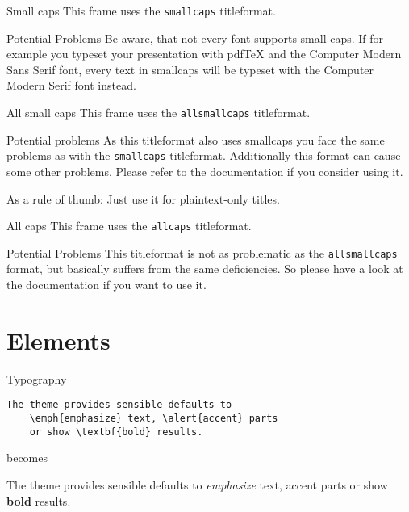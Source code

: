 \documentclass[10pt]{beamer}
\begin{document}
    {
\begin{frame}{Small caps}
        This frame uses the \texttt{smallcaps} titleformat.
    
        \begin{alertblock}{Potential Problems}
            Be aware, that not every font supports small caps. If for example you typeset your presentation with pdfTeX and the Computer Modern Sans Serif font, every text in smallcaps will be typeset with the Computer Modern Serif font instead.
        \end{alertblock}
\end{frame}
    }
    
    {
\begin{frame}{All small caps}
        This frame uses the \texttt{allsmallcaps} titleformat.
    
        \begin{alertblock}{Potential problems}
            As this titleformat also uses smallcaps you face the same problems as with the \texttt{smallcaps} titleformat. Additionally this format can cause some other problems. Please refer to the documentation if you consider using it.
    
            As a rule of thumb: Just use it for plaintext-only titles.
        \end{alertblock}
\end{frame}
    }
    
    {
\begin{frame}{All caps}
        This frame uses the \texttt{allcaps} titleformat.
    
        \begin{alertblock}{Potential Problems}
            This titleformat is not as problematic as the \texttt{allsmallcaps} format, but basically suffers from the same deficiencies. So please have a look at the documentation if you want to use it.
        \end{alertblock}
\end{frame}
    }
    
\section{Elements}
    
\begin{frame}[fragile]{Typography}
          \begin{verbatim}The theme provides sensible defaults to
    \emph{emphasize} text, \alert{accent} parts
    or show \textbf{bold} results.\end{verbatim}
    
      \begin{center}becomes\end{center}
    
      The theme provides sensible defaults to \emph{emphasize} text,
      \alert{accent} parts or show \textbf{bold} results.
\end{frame}
    
\end{document}
